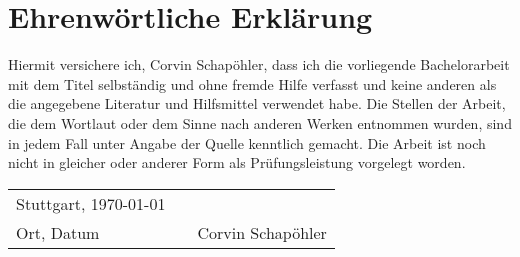 \chapter{Ehrenwörtliche Erklärung}
\thispagestyle{front}
Hiermit versichere ich, Corvin Schapöhler, dass ich die vorliegende Bachelorarbeit mit dem Titel \glqq \thetitle\grqq{} selbständig und ohne fremde Hilfe verfasst und keine anderen als die angegebene Literatur und Hilfsmittel verwendet habe. Die Stellen der Arbeit, die dem Wortlaut oder dem Sinne nach anderen Werken entnommen wurden, sind in jedem Fall unter Angabe der Quelle kenntlich gemacht. Die Arbeit ist noch nicht in gleicher oder anderer Form als Prüfungsleistung vorgelegt worden.
\vspace{2cm}

\begin{center}
	\begin{tabular}[h]{lp{2cm}p{5.5cm}}
		Stuttgart, \today & & \\
		\cline{1-1}\cline{3-3}
		Ort, Datum& & Corvin Schapöhler\\
	\end{tabular}
\end{center}
